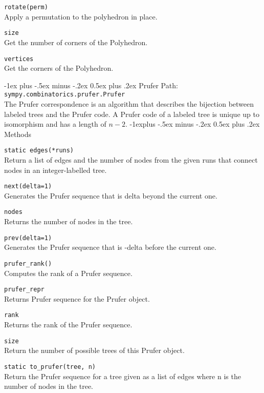 \documentclass[10pt,landscape]{article}
\makeatletter
\renewcommand{\section}{\@startsection{section}{1}{0mm}%
                                {-1ex plus -.5ex minus -.2ex}%
                                {0.5ex plus .2ex}%
                                {\normalfont\large\bfseries}}
\renewcommand{\subsection}{\@startsection{subsection}{2}{0mm}%
                                {-1explus -.5ex minus -.2ex}%
                                {0.5ex plus .2ex}%
                                {\normalfont\normalsize\bfseries}}
\makeatother
\begin{document}
\begin{multicols}{3}
\verb!rotate(perm)!\\
Apply a permutation to the polyhedron in place.


\verb!size!\\
Get the number of corners of the Polyhedron.

\verb!vertices!\\
Get the corners of the Polyhedron.

\section{Prufer}
Path: \verb!sympy.combinatorics.prufer.Prufer!\\
The Prufer correspondence is an algorithm that describes the bijection
 between labeled trees and the Prufer code.
  A Prufer code of a labeled tree is unique up to
   isomorphism and has a length of $n - 2$.
\subsection{Methods}


\verb!static edges(*runs)!\\
Return a list of edges and the number of nodes from the given
 runs that connect nodes in an integer-labelled tree.

 \verb!next(delta=1)!\\
Generates the Prufer sequence that is delta beyond the current one.


\verb!nodes!\\
Returns the number of nodes in the tree.


\verb!prev(delta=1)!\\
Generates the Prufer sequence that is -delta before the current one.



\verb!prufer_rank()!\\
Computes the rank of a Prufer sequence.


\verb!prufer_repr!\\
Returns Prufer sequence for the Prufer object.


\verb!rank!\\
Returns the rank of the Prufer sequence.


\verb!size!\\
Return the number of possible trees of this Prufer object.



\verb!static to_prufer(tree, n)!\\
Return the Prufer sequence for a tree given as a list of edges where n is the number of nodes in the tree.




\end{multicols}
\end{document}
